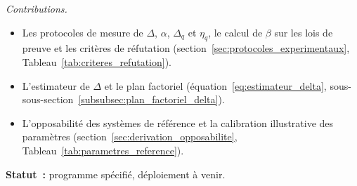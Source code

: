 \begin{sloppypar}
\noindent\textit{Contributions.}
\begin{itemize}
  \item[\textbf{C6.1}] Les protocoles de mesure de $\Delta$, $\alpha$, $\Delta_q$ et $\eta_q$, le calcul de $\beta$ sur les lois de preuve et les crit\`eres de r\'efutation (section~\ref{sec:protocoles_experimentaux}, Tableau~\ref{tab:criteres_refutation}).
  \item[\textbf{C6.2}] L'estimateur de $\Delta$ et le plan factoriel (\'equation~\eqref{eq:estimateur_delta}, sous-sous-section~\ref{subsubsec:plan_factoriel_delta}).
  \item[\textbf{C6.3}] L'opposabilit\'e des syst\`emes de r\'ef\'erence et la calibration illustrative des param\`etres (section~\ref{sec:derivation_opposabilite}, Tableau~\ref{tab:parametres_reference}).
\end{itemize}

\textbf{Statut~:} programme sp\'ecifi\'e, d\'eploiement \`a venir.
\end{sloppypar}

